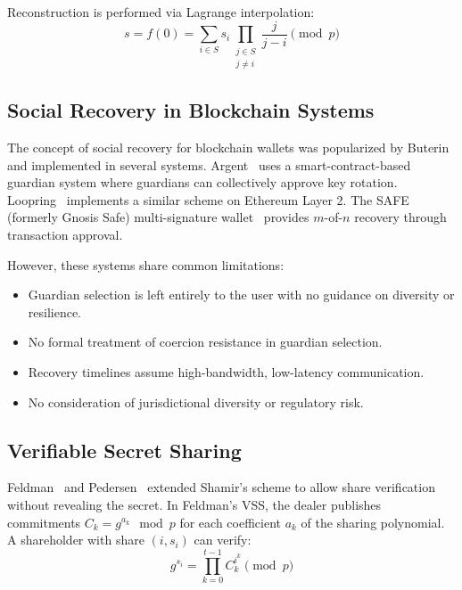 \documentclass[11pt,a4paper,twocolumn]{article}
\begin{document}
Reconstruction is performed via Lagrange interpolation:
\begin{equation}\label{eq:lagrange}
  s = f(0) = \sum_{i \in S} s_i \prod_{\substack{j \in S \\ j \neq i}} \frac{j}{j - i} \pmod{p}
\end{equation}

\subsection{Social Recovery in Blockchain Systems}

The concept of social recovery for blockchain wallets was popularized by Buterin~\cite{buterin2021social} and implemented in several systems. Argent~\cite{argent2020} uses a smart-contract-based guardian system where guardians can collectively approve key rotation. Loopring~\cite{loopring2021} implements a similar scheme on Ethereum Layer 2. The SAFE (formerly Gnosis Safe) multi-signature wallet~\cite{gnosis2022safe} provides $m$-of-$n$ recovery through transaction approval.

However, these systems share common limitations:
\begin{itemize}
  \item Guardian selection is left entirely to the user with no guidance on diversity or resilience.
  \item No formal treatment of coercion resistance in guardian selection.
  \item Recovery timelines assume high-bandwidth, low-latency communication.
  \item No consideration of jurisdictional diversity or regulatory risk.
\end{itemize}

\subsection{Verifiable Secret Sharing}

Feldman~\cite{feldman1987practical} and Pedersen~\cite{pedersen1991non} extended Shamir's scheme to allow share verification without revealing the secret. In Feldman's VSS, the dealer publishes commitments $C_k = g^{a_k} \mod p$ for each coefficient $a_k$ of the sharing polynomial. A shareholder with share $(i, s_i)$ can verify:
\begin{equation}\label{eq:feldman}
  g^{s_i} = \prod_{k=0}^{t-1} C_k^{i^k} \pmod{p}
\end{equation}
\end{document}
